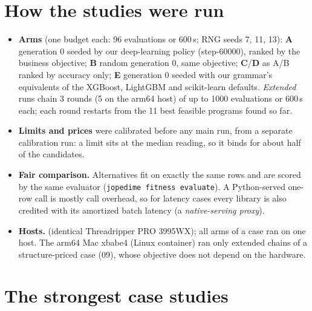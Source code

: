 \documentclass[10.5pt]{article}
\begin{document}
\section{How the studies were run}
\begin{itemize}
\item \textbf{Arms} (one budget each: 96 evaluations or 600\,s; RNG seeds 7, 11, 13):
  \textbf{A} generation 0 seeded by our deep-learning policy (step-60000), ranked by the business objective;
  \textbf{B} random generation 0, same objective;
  \textbf{C}/\textbf{D} as A/B ranked by accuracy only;
  \textbf{E} generation 0 seeded with our grammar's equivalents of the XGBoost, LightGBM and scikit-learn defaults.
  \emph{Extended} runs chain 3 rounds (5 on the arm64 host) of up to 1000 evaluations or 600\,s each; each round restarts from
  the 11 best feasible programs found so far.
\item \textbf{Limits and prices} were calibrated before any main run, from a separate calibration run: a limit sits at the
median reading, so it binds for about half of the candidates.
\item \textbf{Fair comparison.} Alternatives fit on exactly the same rows and are scored by the same evaluator
(\texttt{jopedime fitness evaluate}). A Python-served one-row call is mostly call overhead, so for latency cases every library is
also credited with its amortized batch latency (a \emph{native-serving proxy}).
\item \textbf{Hosts.} \BriefHosts{} (identical Threadripper PRO 3995WX); all arms of a case ran on one host. The arm64 Mac xbabe4
(Linux container) ran only extended chains of a structure-priced case (09), whose objective does not depend on the hardware.
\end{itemize}

\section{The strongest case studies}

\end{document}
